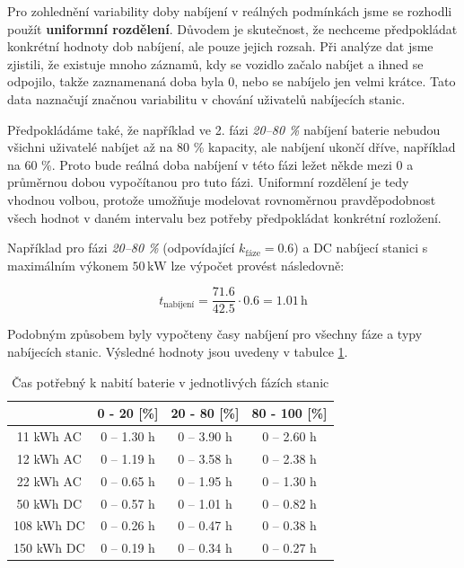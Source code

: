 \documentclass[a4paper,11pt]{article}
\begin{document}
Pro zohlednění variability doby nabíjení v reálných podmínkách jsme se rozhodli použít \textbf{uniformní rozdělení}.
Důvodem je skutečnost, že nechceme předpokládat konkrétní hodnoty dob nabíjení, ale pouze jejich rozsah.
Při analýze dat jsme zjistili, že existuje mnoho záznamů, kdy se vozidlo začalo nabíjet a ihned se odpojilo, takže
zaznamenaná doba byla 0, nebo se nabíjelo jen velmi krátce. Tato data naznačují značnou variabilitu v chování
uživatelů nabíjecích stanic.

Předpokládáme také, že například ve 2. fázi \textit{20–80 \%} nabíjení baterie nebudou všichni uživatelé nabíjet až
na 80 \% kapacity, ale nabíjení ukončí dříve, například na 60 \%. Proto bude reálná doba nabíjení v této fázi ležet
někde mezi 0 a průměrnou dobou vypočítanou pro tuto fázi. Uniformní rozdělení je tedy vhodnou volbou, protože
umožňuje modelovat rovnoměrnou pravděpodobnost všech hodnot v daném intervalu bez potřeby předpokládat konkrétní
rozložení.

Například pro fázi \textit{20–80 \%} (odpovídající \(k_{\text{fáze}} = 0.6\)) a DC nabíjecí stanici s maximálním výkonem \(50 \, \mathrm{kW}\) lze výpočet provést následovně:

\[
t_{\text{nabíjení}} = \frac{71.6}{42.5} \cdot 0.6 = 1.01 \, \mathrm{h}
\]

Podobným způsobem byly vypočteny časy nabíjení pro všechny fáze a typy nabíjecích stanic. Výsledné hodnoty jsou uvedeny v tabulce \ref{table:charging-time-consumption}.


\begin{table}[H]
    \centering 
    \vspace{0.5cm} %
    \begin{tabular}{|c|c|c|c|}
        \hline
        \textbf{} & \textbf{0 - 20 [\%]} & \textbf{20 - 80 [\%]} & \textbf{80 - 100 [\%]}\\
        \hline
        11 kWh AC  &  0 -- 1.30 h  & 0 -- 3.90 h & 0 -- 2.60 h  \\
        \hline
        12 kWh AC  &  0 -- 1.19 h  & 0 -- 3.58 h & 0 -- 2.38 h  \\
        \hline
        22 kWh AC  &  0 -- 0.65 h  & 0 -- 1.95 h & 0 -- 1.30 h  \\
        \hline
        50 kWh DC  &  0 -- 0.57 h & 0 -- 1.01 h & 0 -- 0.82 h  \\
        \hline
        108 kWh DC &  0 -- 0.26 h  & 0 -- 0.47 h & 0 -- 0.38 h  \\
        \hline
        150 kWh DC &  0 -- 0.19 h  & 0 -- 0.34 h & 0 -- 0.27 h  \\
        \hline
    \end{tabular}
    \caption{Čas potřebný k nabití baterie v jednotlivých fázích stanic}
    \label{table:charging-time-consumption}
    \vspace{0.5cm} %
\end{table}
\end{document}

